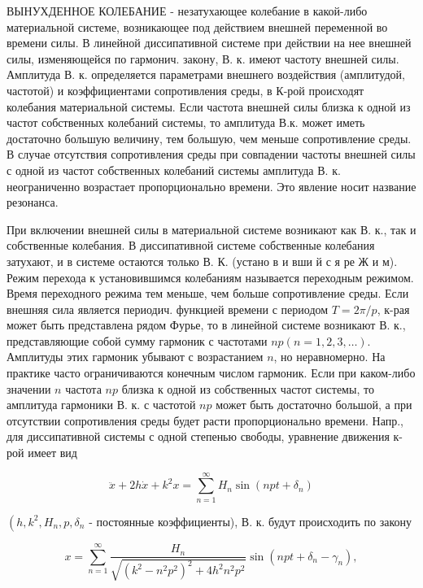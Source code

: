 \documentclass[10pt]{article}
\begin{document}
ВЫНУХДЕННОЕ КОЛЕБАНИЕ - незатухающее колебание в какой-либо материальной системе, возникающее под действием внешней переменной во времени силы. В линейной диссипативной системе при действии на нее внешней силы, изменяющейся по гармонич. закону, В. к. имеют частоту внешней силы. Амплитуда В. к. определяется параметрами внешнего воздействия (амплитудой, частотой) и коэффициентами сопротивления среды, в К-рой происходят колебания материальной системы. Если частота внешней силы близка к одной из частот собственных колебаний системы, то амплитуда В.к. может иметь достаточно большую величину, тем большую, чем меньше сопротивление среды. В случае отсутствия сопротивления среды при совпадении частоты внешней силы с одной из частот собственных колебаний системы амплитуда В. к. неограниченно возрастает пропорционально времени. Это явление носит название резонанса.



При включении внешней силы в материальной системе возникают как В. к., так и собственные колебания. В диссипативной системе собственные колебания затухают, и в системе остаются только В. К. (устано в и вши й с я ре Ж и м). Режим перехода к установившимся колебаниям называется переходным режимом. Время переходного режима тем меньше, чем больше сопротивление среды. Если внешняя сила является периодич. функцией времени с периодом $T=2 \pi / p$, к-рая может быть представлена рядом Фурье, то в линейной системе возникают В. к., представляющие собой сумму гармоник с частотами $n p(n=1,2,3, \ldots)$. Амплитуды этих гармоник убывают с возрастанием $n$, но неравномерно. На практике часто ограничиваются конечным числом гармоник. Если при каком-либо значении $n$ частота $n p$ близка к одной из собственных частот системы, то амплитуда гармоники В. к. с частотой $n p$ может быть достаточно большой, а при отсутствии сопротивления среды будет расти пропорционально времени. Напр., для диссипативной системы с одной степенью свободы, уравнение движения к-рой имеет вид



\[

\ddot{x}+2 h \dot{x}+k^{2} x=\sum_{n=1}^{\infty} H_{n} \sin \left(n p t+\delta_{n}\right)

\]



$\left(h, k^{2}, H_{n}, p, \delta_{n}\right.$ - постоянные коэффициенты), В. к. будут происходить по закону



\[

x=\sum_{n=1}^{\infty} \frac{H_{n}}{\sqrt{\left(k^{2}-n^{2} p^{2}\right)^{2}+4 h^{2} n^{2} p^{2}}} \sin \left(n p t+\delta_{n}-\gamma_{n}\right),

\]
\end{document}
